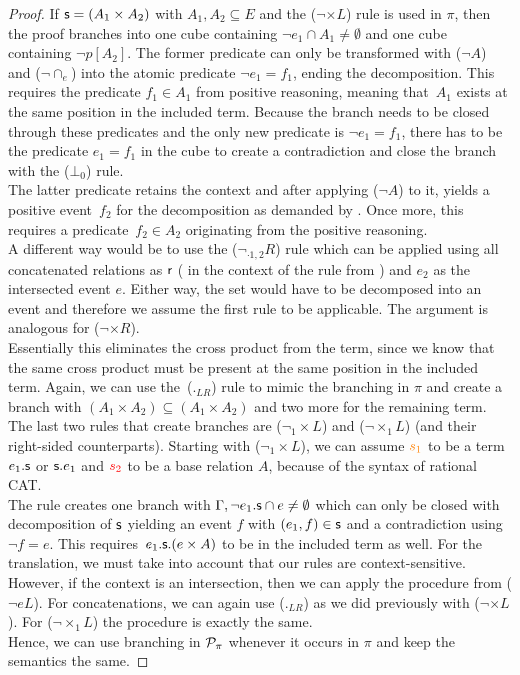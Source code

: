 \documentclass[a4paper,twoside,12pt, english]{article}
\begin{document}
\begin{proof}
If $\textsf{\upshape s} = (A_1 \times A_2)$ with $A_1,A_2 \subseteq E$ and the ($\neg {\times} L$) rule is used in $\pi$, then the proof branches into one cube containing $\neg e_1 \cap A_1 \neq \emptyset$ and one cube containing $\neg p[A_2]$. The former predicate can only be transformed with ($\neg A$) and ($\neg\cap_e$) into the atomic predicate $\neg e_1 = f_1$, ending the decomposition. This requires the predicate $f_1 \in A_1$ from positive reasoning, meaning that~$A_1$ exists at the same position in the included term. \newpage
Because the branch needs to be closed through these predicates and the only new predicate is $\neg e_1 = f_1$, there has to be the predicate $e_1 = f_1$ in the cube to create a contradiction and close the branch with the ($\bot_0$) rule. \\ 
The latter predicate retains the context and after applying ($\neg A$) to it, yields a positive event~$f_2$ for the decomposition as demanded by . Once more, this requires a predicate~$f_2 \in A_2$ originating from the positive reasoning. \\
A different way would be to use the ($\neg_{\cdot 1,2}R$) rule which can be applied using all concatenated relations as $\textsf{\upshape r}$ (\textcolor{red}{\Relr{}} in the context of the rule from \cite{Gru+26}) and $e_2$ as the intersected event $e$. Either way, the set would have to be decomposed into an event and therefore we assume the first rule to be applicable. 
The argument is analogous for ($\neg {\times}R$). \\
Essentially this eliminates the cross product from the term, since we know that the same cross product must be present at the same position in the included term. Again, we can use the~($._{LR}$) rule to mimic the branching in $\pi$ and create a branch with $(A_1 \times A_2) \subseteq (A_1 \times A_2)$ and two more for the remaining term. \\

The last two rules that create branches are ($\neg_1 {\times} L$) and ($\neg {\times_1}L$) (and their right-sided counterparts). Starting with ($\neg_1 {\times} L$), we can assume $\color{orange}{s_1}$ to be a term $e_1.\textsf{\upshape s}$ or $\textsf{\upshape s}.e_1$ and $\color{red}{s_2}$ to be a base relation $A$, because of the syntax of rational CAT. \\
The rule creates one branch with $\Gamma, \neg e_1.\textsf{\upshape s} \cap e \neq \emptyset$ which can only be closed with decomposition of $\textsf{\upshape s}$ yielding an event $f$ with $(e_1,f) \in \textsf{\upshape s}$ and a contradiction using $\neg f = e$. This requires~$e_1.\textsf{\upshape s}.(e \times A)$ to be in the included term as well. For the translation, we must take into account that our rules are context-sensitive. However, if the context is an intersection, then we can apply the procedure from ($\neg eL$). For concatenations, we can again use ($._{LR}$) as we did previously with ($\neg {\times}L$).
For ($\neg {\times_1}L$) the procedure is exactly the same. \\
Hence, we can use branching in $\mathcal{P}_\pi$ whenever it occurs in $\pi$ and keep the semantics the same. 
\end{proof}
\end{document}
